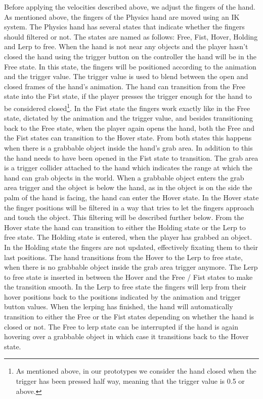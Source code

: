 Before applying the velocities described above, we adjust the fingers of the hand. As mentioned above, the fingers of the Physics hand are moved using an IK system. The Physics hand has several states that indicate whether the fingers should filtered or not. The states are named as follows: Free, Fist, Hover, Holding and Lerp to free. When the hand is not near any objects and the player hasn't closed the hand using the trigger button on the controller the hand will be in the Free state. In this state, the fingers will be positioned according to the animation and the trigger value. The trigger value is used to blend between the open and closed frames of the hand's animation. The hand can transition from the Free state into the Fist state, if the player presses the trigger enough for the hand to be considered closed\footnote{As mentioned above, in our prototypes we consider the hand closed when the trigger has been pressed half way, meaning that the trigger value is 0.5 or above.}. In the Fist state the fingers work exactly like in the Free state, dictated by the animation and the trigger value, and besides transitioning back to the Free state, when the player again opens the hand, both the Free and the Fist states can transition to the Hover state. From both states this happens when there is a grabbable object inside the hand's grab area. In addition to this the hand needs to have been opened in the Fist state to transition. The grab area is a trigger collider attached to the hand which indicates the range at which the hand can grab objects in the world. When a grabbable object enters the grab area trigger and the object is below the hand, as in the object is on the side the palm of the hand is facing, the hand can enter the Hover state. In the Hover state the finger positions will be filtered in a way that tries to let the fingers approach and touch the object. This filtering will be described further below. From the Hover state the hand can transition to either the Holding state or the Lerp to free state. The Holding state is entered, when the player has grabbed an object. In the Holding state the fingers are not updated, effectively fixating them to their last positions. The hand transitions from the Hover to the Lerp to free state, when there is no grabbable object inside the grab area trigger anymore. The Lerp to free state is inserted in between the Hover and the Free / Fist states to make the transition smooth. In the Lerp to free state the fingers will lerp from their hover positions back to the positions indicated by the animation and trigger button values. When the lerping has finished, the hand will automatically transition to either the Free or the Fist states depending on whether the hand is closed or not. The Free to lerp state can be interrupted if the hand is again hovering over a grabbable object in which case it transitions back to the Hover state.

